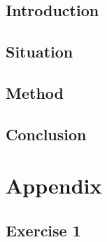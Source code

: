 \documentclass[reprint,english,notitlepage]{revtex4-2}
\begin{document}
    \subsection{Introduction}\label{subsec:introduction7}
    \subsection{Situation}\label{subsec:situation7}
    \subsection{Method}\label{subsec:method7}
    \subsection{Conclusion}\label{subsec:conclusion7}



\section{Appendix}\label{sec:appendix}
    \subsection{Exercise 1}\label{subsec:exercise-1}
\end{document}
